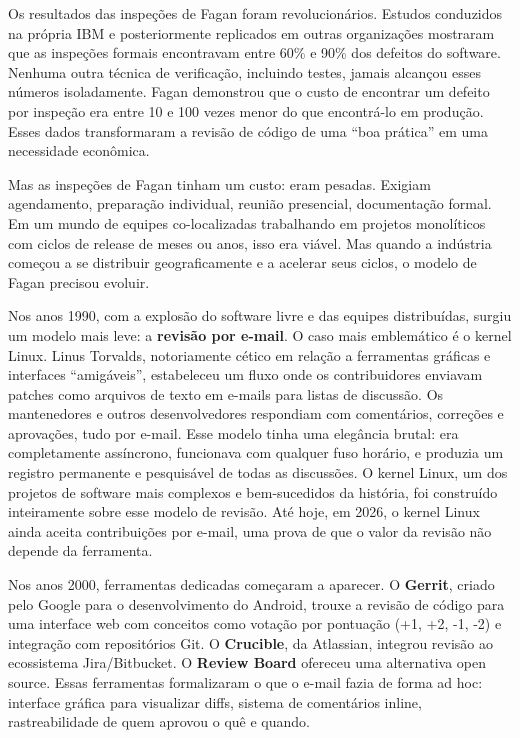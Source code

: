 Os resultados das inspeções de Fagan foram revolucionários.
Estudos conduzidos na própria IBM e posteriormente replicados em outras organizações
mostraram que as inspeções formais encontravam entre 60\% e 90\% dos defeitos do
software. Nenhuma outra técnica de verificação, incluindo testes, jamais
alcançou esses números isoladamente. Fagan demonstrou que o custo de encontrar um defeito por inspeção
era entre 10 e 100 vezes menor do que encontrá-lo em produção. Esses dados transformaram
a revisão de código de uma ``boa prática'' em uma necessidade econômica.

Mas as inspeções de Fagan tinham um custo: eram pesadas. Exigiam agendamento, preparação
individual, reunião presencial, documentação formal. Em um mundo de equipes co-localizadas
trabalhando em projetos monolíticos com ciclos de release de meses ou anos, isso era
viável. Mas quando a indústria começou a se distribuir geograficamente e a acelerar seus
ciclos, o modelo de Fagan precisou evoluir.

Nos anos 1990, com a explosão do software livre e das equipes distribuídas, surgiu um
modelo mais leve: a \textbf{revisão por e-mail}. O caso mais emblemático é o kernel
Linux. Linus Torvalds, notoriamente cético em relação a ferramentas gráficas e
interfaces ``amigáveis'', estabeleceu um fluxo onde os contribuidores enviavam patches
como arquivos de texto em e-mails para listas de discussão. Os mantenedores e outros
desenvolvedores respondiam com comentários, correções e aprovações, tudo por e-mail.
Esse modelo tinha uma elegância brutal: era completamente assíncrono, funcionava com
qualquer fuso horário, e produzia um registro permanente e pesquisável de todas as
discussões. O kernel Linux, um dos projetos de software mais complexos e
bem-sucedidos da história, foi construído inteiramente sobre esse modelo de revisão.
Até hoje, em 2026, o kernel Linux ainda aceita contribuições por e-mail, uma prova
de que o valor da revisão não depende da ferramenta.

Nos anos 2000, ferramentas dedicadas começaram a aparecer. O \textbf{Gerrit}, criado
pelo Google para o desenvolvimento do Android, trouxe a revisão de código para uma
interface web com conceitos como votação por pontuação (+1, +2, -1, -2) e integração
com repositórios Git. O \textbf{Crucible}, da Atlassian, integrou revisão ao
ecossistema Jira/Bitbucket. O \textbf{Review Board} ofereceu uma alternativa open
source. Essas ferramentas formalizaram o que o e-mail fazia de forma ad hoc: interface
gráfica para visualizar diffs, sistema de comentários inline, rastreabilidade de quem
aprovou o quê e quando.


